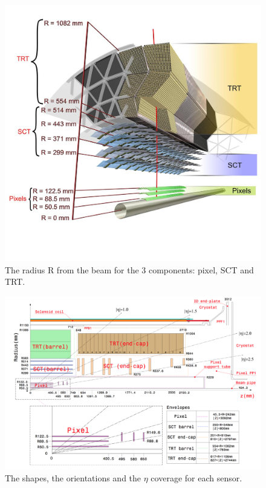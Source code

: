 \begin{figure}
\centering
\includegraphics[width=\textwidth]{data/photo/detector/inner_detail.jpg}
\caption{The radius R from the beam for the 3 components: pixel, SCT and TRT. \cite{inner_photo}}
\label{fig:detector_inner_detail}
\end{figure}
\begin{figure}
\centering
\includegraphics[width=\textwidth]{data/photo/detector/inner_size.png}
\caption{The shapes, the orientations and the $\eta$ coverage for each sensor. \cite{ATLAS_doc}}
\label{fig:detector_inner_size}
\end{figure}

